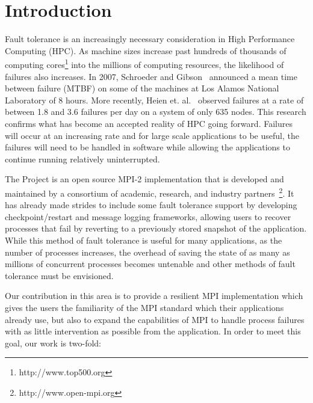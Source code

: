 \section{Introduction} \label{sect:intro}


Fault tolerance is an increasingly necessary consideration in High Performance
Computing (HPC). As machine sizes increase past hundreds of thousands of
computing cores\footnote{http://www.top500.org} into the millions of computing
resources, the likelihood of failures also increases. In 2007, Schroeder and
Gibson~\cite{schroeder2007understanding} announced a mean time between failure
(MTBF) on some of the machines at Los Alamos National Laboratory of 8 hours.
More recently, Heien et. al.~\cite{HeienModellingHPCFailures} observed failures
at a rate of between 1.8 and 3.6 failures per day on a system of only 635 nodes.
This research confirms what has become an accepted reality of HPC going forward.
Failures will occur at an increasing rate and for large scale applications to be
useful, the failures will need to be handled in software while allowing the
applications to continue running relatively uninterrupted.

The \ompi Project is an open source MPI-2 implementation that is developed and
maintained by a consortium of academic, research, and industry
partners~\footnote{http://www.open-mpi.org}. It has already made strides to
include some fault tolerance support by developing checkpoint/restart and
message logging frameworks, allowing users to recover processes that fail by
reverting to a previously stored snapshot of the application. While this method
of fault tolerance is useful for many applications, as the number of processes
increases, the overhead of saving the state of as many as millions of concurrent
processes becomes untenable and other methods of fault tolerance must be
envisioned.

Our contribution in this area is to provide a resilient MPI implementation which
gives the users the familiarity of the MPI standard which their applications
already use, but also to expand the capabilities of MPI to handle process
failures with as little intervention as possible from the application. In order
to meet this goal, our work is two-fold:

